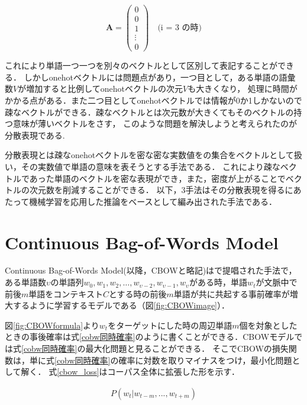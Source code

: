 \documentclass[a4j,11pt,report]{jsbook}
\begin{document}
\begin{equation}
  \label{onehot}
  \bm{A} = \left(
  \begin{array}{c}
    0 \\
    0 \\
    1 \\
    \vdots \\
    0
  \end{array}
  \right)
  \quad \text{(i = 3 の時)}
\end{equation}


これにより単語一つ一つを別々のベクトルとして区別して表記することができる．
しかしonehotベクトルには問題点があり，一つ目として，ある単語の語彙数$V$が増加すると比例してonehotベクトルの次元$V$も大きくなり，
処理に時間がかかる点がある．また二つ目としてonehotベクトルでは情報が0か1しかないので疎なベクトルができる．疎なベクトルとは次元数が大きくてもそのベクトルの持つ意味が薄いベクトルをさす，
このような問題を解決しようと考えられたのが分散表現である.

分散表現とは疎なonehotベクトルを密な密な実数値をの集合をベクトルとして扱い，その実数値で単語の意味を表そうとする手法である．
これにより疎なベクトルであった単語のベクトルを密な表現ができ，また，密度が上がることでベクトルの次元数を削減することができる．
以下，3手法はその分散表現を得るにあたって機械学習を応用した推論をベースとして編み出された手法である．

\clearpage
\section{Continuous Bag-of-Words Model\label{sec:CBOW}}
Continuous Bag-of-Words Model(以降，CBOWと略記)は\cite{SkipCBOW}で提唱された手法で，
ある単語数$\upsilon$の単語列$w_{0},w_{1},w_{2},\dots,w_{\upsilon-2},w_{\upsilon-1},w_{\upsilon}$がある時，単語$w_{t}$が文脈中で前後$m$単語をコンテキスト$C$とする時の前後$m$単語が共に共起する事前確率が増大するように学習するモデルである（図\ref{fig:CBOWimage}）．


図\ref{fig:CBOWformula}より$w_{t}$をターゲットにした時の周辺単語$m$個を対象としたときの事後確率は式\ref{cobw同時確率}のように書くことができる．CBOWモデルでは式\ref{cobw同時確率}の最大化問題と見ることができる．
そこでCBOWの損失関数は，単に式\ref{cobw同時確率}の確率に対数を取りマイナスをつけ，最小化問題として解く．
式\ref{cbow_loss}はコーパス全体に拡張した形を示す．



\begin{equation}[tb]
  \label{cobw同時確率}
  \begin{array}{c}
    P(w_{t}|w_{t-m},...,w_{t+m})
  \end{array}
\end{equation}
\end{document}

